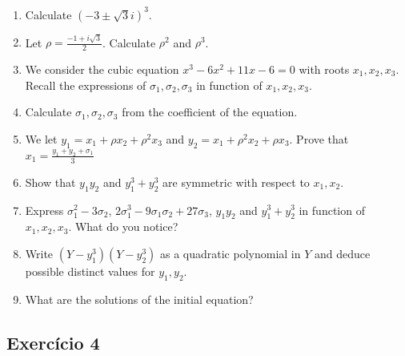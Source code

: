 \begin{enumerate}

\item Calculate $\left(-3\pm\sqrt{3}i\right)^3$.
\item Let $\rho = \frac{-1+i\sqrt{3}}{2}$. Calculate
  $\rho^2$ and $\rho^3$.
\item We consider the cubic equation
  $x^3-6x^2+11x-6= 0$
  with roots $x_1,x_2,x_3$. Recall the expressions of
  $\sigma_1,\sigma_2,\sigma_3$ in function of $x_1,x_2,x_3$.
\item Calculate $\sigma_1,\sigma_2,\sigma_3$ from the coefficient of the
  equation.
\item We let $y_1 = x_1+ \rho x_2 + \rho^2 x_3$ and
  $y_2 = x_1+ \rho^2 x_2 + \rho x_3$.
  Prove that $x_1 = \frac{y_1+y_2+\sigma_1}{3}$
\item Show that $y_1y_2$ and $y_1^3+y_2^3$
  are symmetric with respect to $x_1,x_2$.
\item Express $\sigma_1^2-3\sigma_2$,
  $2\sigma_1^3-9\sigma_1\sigma_2+27\sigma_3$,
  $y_1y_2$ and $y_1^3 + y_2^3$ in function of $x_1,x_2,x_3$. What do you notice?
\item Write ${(Y-y_1^3)}{(Y-y_2^3)}$ as a quadratic polynomial in $Y$ and
  deduce possible distinct values for $y_1, y_2$.
\item What are the solutions of the initial equation?
\end{enumerate}

\subsection*{Exercício 4}

